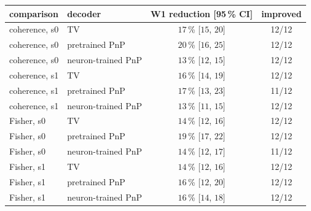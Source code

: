 \begin{tabular}{@{}llcc@{}}\toprule
comparison & decoder & W1 reduction [95\,\% CI] & improved\\\midrule
coherence, s0 & TV & $17$\,\% [$15$, $20$] & 12/12\\
coherence, s0 & pretrained PnP & $20$\,\% [$16$, $25$] & 12/12\\
coherence, s0 & neuron-trained PnP & $13$\,\% [$12$, $15$] & 12/12\\
coherence, s1 & TV & $16$\,\% [$14$, $19$] & 12/12\\
coherence, s1 & pretrained PnP & $17$\,\% [$13$, $23$] & 11/12\\
coherence, s1 & neuron-trained PnP & $13$\,\% [$11$, $15$] & 12/12\\
Fisher, s0 & TV & $14$\,\% [$12$, $16$] & 12/12\\
Fisher, s0 & pretrained PnP & $19$\,\% [$17$, $22$] & 12/12\\
Fisher, s0 & neuron-trained PnP & $14$\,\% [$12$, $17$] & 11/12\\
Fisher, s1 & TV & $14$\,\% [$12$, $16$] & 12/12\\
Fisher, s1 & pretrained PnP & $16$\,\% [$12$, $20$] & 12/12\\
Fisher, s1 & neuron-trained PnP & $16$\,\% [$14$, $18$] & 12/12\\
\bottomrule\end{tabular}
